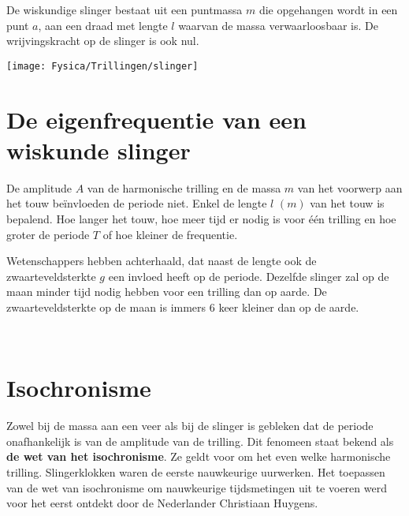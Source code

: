 \documentclass{ximera}
\begin{document}
    \author{Ingmar Herreman}
    \date{Januari 2024}

De wiskundige slinger bestaat uit een puntmassa $m$ die opgehangen wordt in een punt $a$, aan een draad met lengte $l$ waarvan de massa verwaarloosbaar is. De wrijvingskracht op de slinger is ook nul.

\begin{center}
    \texttt{[image: Fysica/Trillingen/slinger]}
\end{center}

\section{De eigenfrequentie van een wiskunde slinger}

De amplitude $A$ van de harmonische trilling en de massa $m$ van het voorwerp aan het touw beïnvloeden de periode niet. Enkel de lengte $l$ $(m)$ van het touw is bepalend. Hoe langer het touw, hoe meer tijd er nodig is voor één trilling en hoe groter de periode $T$ of hoe kleiner de frequentie.

Wetenschappers hebben achterhaald, dat naast de lengte ook de zwaarteveldsterkte $g$ een invloed heeft op de periode. Dezelfde slinger zal op de maan minder tijd nodig hebben voor een trilling dan op aarde. De zwaarteveldsterkte op de maan is immers 6 keer kleiner dan op de aarde.

\begin{definition}
      \ \\
    \begin{center}
    \end{center}
\end{definition}

\section{Isochronisme}
Zowel bij de massa aan een veer als bij de slinger is gebleken dat de periode onafhankelijk is van de amplitude van de trilling. Dit fenomeen staat bekend als \textbf{de wet van het isochronisme}.
Ze geldt voor om het even welke harmonische trilling.
Slingerklokken waren de eerste nauwkeurige uurwerken. Het toepassen van de wet van isochronisme om nauwkeurige tijdsmetingen uit te voeren werd voor het eerst ontdekt door de Nederlander Christiaan Huygens.
\end{document}
